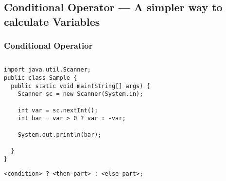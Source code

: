 \documentclass[en, 11pt, xcolor=dvipsnames]{beamer}
\begin{document}
\subsection{Conditional Operator --- A simpler way to calculate Variables}
\begin{frame}[fragile]
	\frametitle{Conditional Operatior}



	\begin{columns}[c]
		\begin{column}{0.98\textwidth}

			\begin{lstlisting}[style=Java]
import java.util.Scanner;
public class Sample {
  public static void main(String[] args) {
    Scanner sc = new Scanner(System.in);

    int var = sc.nextInt();
    int bar = var > 0 ? var : -var;

    System.out.println(bar);

  }
}
\end{lstlisting}
			\begin{lstlisting}[style=Java]
<condition> ? <then-part> : <else-part>;
\end{lstlisting}
		\end{column}
	\end{columns}
\end{frame}

\end{document}
